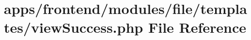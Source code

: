 \hypertarget{frontend_2modules_2file_2templates_2view_success_8php}{\section{apps/frontend/modules/file/templates/view\-Success.php File Reference}
\label{frontend_2modules_2file_2templates_2view_success_8php}
}

